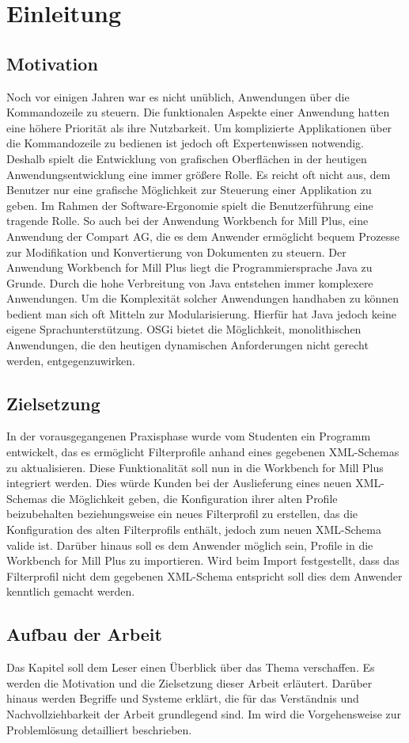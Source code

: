 
\chapter{Einleitung}
\label{cha:Einleitung}

\section{Motivation}{
Noch vor einigen Jahren war es nicht unüblich, Anwendungen über die Kommandozeile zu steuern. Die funktionalen Aspekte einer Anwendung hatten eine höhere Priorität als ihre Nutzbarkeit. Um komplizierte Applikationen über die Kommandozeile zu bedienen ist jedoch oft Expertenwissen notwendig. Deshalb spielt die Entwicklung von grafischen Oberflächen in der heutigen Anwendungsentwicklung eine immer größere Rolle. Es reicht oft nicht aus, dem Benutzer nur eine grafische Möglichkeit zur Steuerung einer Applikation zu geben. Im Rahmen der Software-Ergonomie spielt die Benutzerführung eine tragende Rolle. So auch bei der Anwendung Workbench for Mill Plus, eine Anwendung der Compart AG, die es dem Anwender ermöglicht bequem Prozesse zur Modifikation und Konvertierung von Dokumenten zu steuern. Der Anwendung Workbench for Mill Plus liegt die Programmiersprache Java zu Grunde. Durch die hohe Verbreitung von Java entstehen immer komplexere Anwendungen. Um die Komplexität solcher Anwendungen handhaben zu können bedient man sich oft Mitteln zur Modularisierung. Hierfür hat Java jedoch keine eigene Sprachunterstützung. \ac{OSGi} bietet die Möglichkeit, monolithischen Anwendungen, die den heutigen dynamischen Anforderungen nicht gerecht werden, entgegenzuwirken.
}
\section{Zielsetzung}{
In der vorausgegangenen Praxisphase wurde vom Studenten ein Programm entwickelt, das es ermöglicht Filterprofile anhand eines gegebenen XML-Schemas zu aktualisieren. Diese Funktionalität soll nun in die Workbench for Mill Plus integriert werden. Dies würde Kunden bei der Auslieferung eines neuen XML-Schemas die Möglichkeit geben, die Konfiguration ihrer alten Profile beizubehalten beziehungsweise ein neues Filterprofil zu erstellen, das die Konfiguration des alten Filterprofils enthält, jedoch zum neuen XML-Schema valide ist. Darüber hinaus soll es dem Anwender möglich sein, Profile in die Workbench for Mill Plus zu importieren. Wird beim Import festgestellt, dass das Filterprofil nicht dem gegebenen XML-Schema entspricht soll dies dem Anwender kenntlich gemacht werden. 
}
\section{Aufbau der Arbeit}{
Das Kapitel  soll dem Leser einen Überblick über das Thema verschaffen. Es werden die Motivation und die Zielsetzung dieser Arbeit erläutert. Darüber hinaus werden Begriffe und Systeme erklärt, die für das Verständnis und Nachvollziehbarkeit der Arbeit grundlegend sind. Im  wird die Vorgehensweise zur Problemlösung detailliert beschrieben.
}
